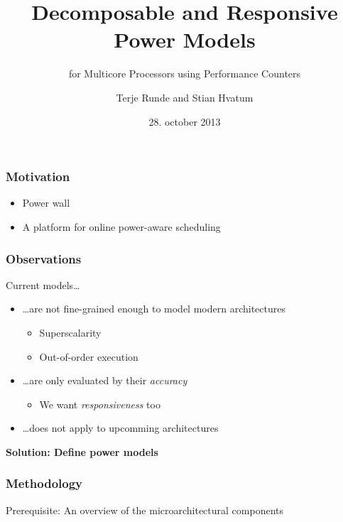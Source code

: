 \documentclass[screen]{beamer}
\title[Paper 8]%
{Decomposable and Responsive Power Models}
\subtitle{for Multicore Processors using Performance Counters}
\author[T. Runde and S. Hvatum]{Terje Runde and Stian Hvatum}
\institute[NTNU]{Institutt for datateknikk og informatikk}
\date{28. october 2013}
\begin{document}
\ntnutitlepage

\begin{frame}
    \frametitle{Motivation}

  \begin{itemize}
    \item Power wall
    \item A platform for online power-aware scheduling
  \end{itemize}

\end{frame}

\begin{frame}
    \frametitle{Observations}

    Current models\ldots

    \begin{itemize}
        \item \ldots are not fine-grained enough to model modern architectures
            \begin{itemize}
                \item Superscalarity
                \item Out-of-order execution
            \end{itemize}
        \item \ldots are only evaluated by their \emph{accuracy}
            \begin{itemize}
                \item We want \emph{responsiveness} too
            \end{itemize}
        \item \ldots does not apply to upcomming architectures
    \end{itemize}

    \pause

\textbf{Solution: Define power models}

\end{frame}

\begin{frame}
    \frametitle{Methodology}
    Prerequisite: An overview of the microarchitectural components
\end{frame}
\end{document}
